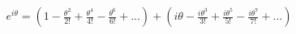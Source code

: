 \documentclass[preview]{standalone}
\begin{document}
\begin{align*}
e^{i\theta} = (1 -\frac{\theta^2}{2!} +\frac{\theta^4}{4!} -\frac{\theta^6}{6!} +...) + (i\theta -\frac{i\theta^3}{3!} +\frac{i\theta^5}{5!} -\frac{i\theta^7}{7!} +...)
\end{align*}
\end{document}
